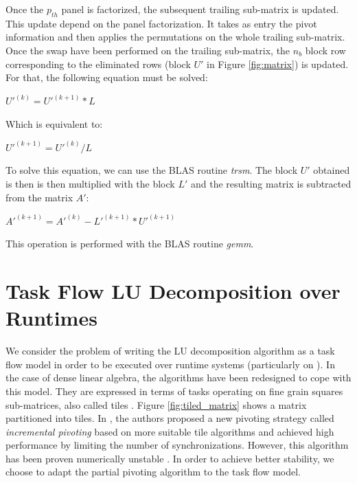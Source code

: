 Once the $p_{th}$ panel is factorized, the subsequent trailing sub-matrix is updated. This update depend on the panel factorization. It takes as entry the pivot information and then applies the permutations on the whole trailing sub-matrix. Once the swap have been performed on the trailing sub-matrix, the $n_b$ block row corresponding to the eliminated rows (block $U'$ in Figure \ref{fig:matrix}) is updated. For that, the following equation must be solved:
\begin{center}
$U'^{(k)} = U'^{(k+1)}*L$
\end{center}
Which is equivalent to:
\begin{center}
$U'^{(k+1)} = U'^{(k)} / L$
\end{center}
To solve this equation, we can use the BLAS routine \textit{trsm}. The block $U'$ obtained is then is then multiplied with the block $L'$ and the resulting matrix is subtracted from the matrix $A'$:
\begin{center}
$A'^{(k+1)} = A'^{(k)} - L'^{(k+1)}*U'^{(k+1)}$
\end{center}
This operation is performed with the BLAS routine \textit{gemm}.


\section{Task Flow LU Decomposition over Runtimes \label{task_flow_lu}}
We consider the problem of writing the LU decomposition algorithm as a task flow model in order to be executed over runtime systems (particularly on \dague). In the case of dense linear algebra, the algorithms have been redesigned to cope with this model. They are expressed in terms of tasks operating on fine grain squares sub-matrices, also called tiles \cite{conf/para/ButtariDKLLT06,ChanEtAl07b}. Figure \ref{fig:tiled_matrix} shows a matrix partitioned into tiles. In \cite{Buttari09}, the authors proposed a new pivoting strategy called \emph{incremental pivoting} based on \cite{Quintana-Orti:2009:ULF} more suitable tile algorithms and achieved high performance by limiting the number of synchronizations. However, this algorithm has been proven numerically unstable \cite{journals/siammax/GrigoriDX11}. In order to achieve better stability, we choose to adapt the partial pivoting algorithm to the task flow model.

